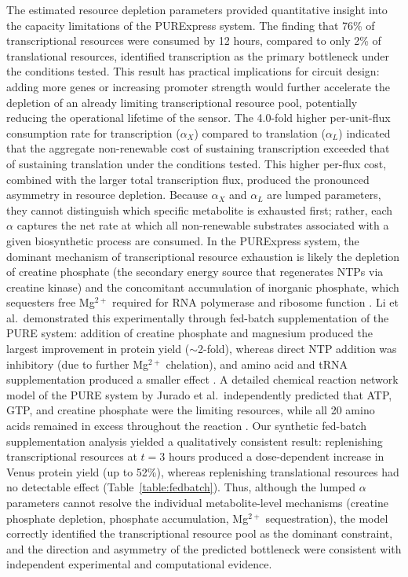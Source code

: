 \documentclass[12pt]{article}
\begin{document}
The estimated resource depletion parameters provided quantitative insight into the capacity limitations of the PURExpress system. The finding that 76\% of transcriptional resources were consumed by 12 hours, compared to only 2\% of translational resources, identified transcription as the primary bottleneck under the conditions tested. This result has practical implications for circuit design: adding more genes or increasing promoter strength would further accelerate the depletion of an already limiting transcriptional resource pool, potentially reducing the operational lifetime of the sensor. The 4.0-fold higher per-unit-flux consumption rate for transcription ($\alpha_X$) compared to translation ($\alpha_L$) indicated that the aggregate non-renewable cost of sustaining transcription exceeded that of sustaining translation under the conditions tested. This higher per-flux cost, combined with the larger total transcription flux, produced the pronounced asymmetry in resource depletion. Because $\alpha_X$ and $\alpha_L$ are lumped parameters, they cannot distinguish which specific metabolite is exhausted first; rather, each $\alpha$ captures the net rate at which all non-renewable substrates associated with a given biosynthetic process are consumed. In the PURExpress system, the dominant mechanism of transcriptional resource exhaustion is likely the depletion of creatine phosphate (the secondary energy source that regenerates NTPs via creatine kinase) and the concomitant accumulation of inorganic phosphate, which sequesters free Mg$^{2+}$ required for RNA polymerase and ribosome function \cite{li2017dissecting}. Li et al.\ demonstrated this experimentally through fed-batch supplementation of the PURE system: addition of creatine phosphate and magnesium produced the largest improvement in protein yield ($\sim$2-fold), whereas direct NTP addition was inhibitory (due to further Mg$^{2+}$ chelation), and amino acid and tRNA supplementation produced a smaller effect \cite{li2017dissecting}. A detailed chemical reaction network model of the PURE system by Jurado et al.\ independently predicted that ATP, GTP, and creatine phosphate were the limiting resources, while all 20 amino acids remained in excess throughout the reaction \cite{jurado2023chemical}. Our synthetic fed-batch supplementation analysis yielded a qualitatively consistent result: replenishing transcriptional resources at $t = 3$ hours produced a dose-dependent increase in Venus protein yield (up to 52\%), whereas replenishing translational resources had no detectable effect (Table~\ref{table:fedbatch}). Thus, although the lumped $\alpha$ parameters cannot resolve the individual metabolite-level mechanisms (creatine phosphate depletion, phosphate accumulation, Mg$^{2+}$ sequestration), the model correctly identified the transcriptional resource pool as the dominant constraint, and the direction and asymmetry of the predicted bottleneck were consistent with independent experimental and computational evidence.
\end{document}
